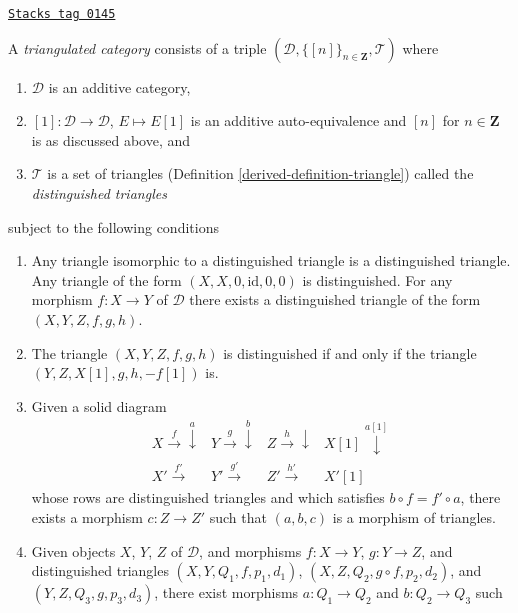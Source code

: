 \begin{definition}
\label{derived-definition-triangulated-category}
\href{https://stacks.math.columbia.edu/tag/0145}{\texttt{Stacks tag 0145}}

A {\it triangulated category} consists of a triple
$(\mathcal{D}, \{[n]\}_{n\in \mathbf{Z}}, \mathcal{T})$
where
\begin{enumerate}
\item $\mathcal{D}$ is an additive category,
\item $[1] : \mathcal{D} \to \mathcal{D}$, $E \mapsto E[1]$
is an additive auto-equivalence and $[n]$ for $n \in \mathbf{Z}$ is
as discussed above, and
\item $\mathcal{T}$ is a set of triangles (Definition \ref{derived-definition-triangle})
called the {\it distinguished triangles}
\end{enumerate}
subject to the following conditions
\begin{enumerate}
\item[TR1] Any triangle isomorphic to a distinguished triangle is
a distinguished triangle. Any triangle of the form
$(X, X, 0, \text{id}, 0, 0)$ is distinguished.
For any morphism $f : X \to Y$ of $\mathcal{D}$ there exists a
distinguished triangle of the form $(X, Y, Z, f, g, h)$.
\item[TR2] The triangle $(X, Y, Z, f, g, h)$ is distinguished
if and only if the triangle $(Y, Z, X[1], g, h, -f[1])$ is.
\item[TR3] Given a solid diagram
$$
\begin{array}{cccc}X \overset{f}{\longrightarrow}\overset{a}{\downarrow} & Y \overset{g}{\longrightarrow}\overset{b}{\downarrow} & Z \overset{h}{\longrightarrow}\downarrow & X[1] \overset{a[1]}{\downarrow} \\ X' \overset{f'}{\longrightarrow} & Y' \overset{g'}{\longrightarrow} & Z' \overset{h'}{\longrightarrow} & X'[1]\end{array}
$$
whose rows are distinguished triangles and which satisfies
$b \circ f = f' \circ a$, there exists a morphism
$c : Z \to Z'$ such that $(a, b, c)$ is a morphism of triangles.
\item[TR4] Given objects $X$, $Y$, $Z$ of $\mathcal{D}$, and morphisms
$f : X \to Y$, $g : Y \to Z$, and distinguished triangles
$(X, Y, Q_1, f, p_1, d_1)$,
$(X, Z, Q_2, g \circ f, p_2, d_2)$,
and
$(Y, Z, Q_3, g, p_3, d_3)$,
there exist
morphisms $a : Q_1 \to Q_2$ and $b : Q_2 \to Q_3$ such

\end{enumerate}
\end{definition}
